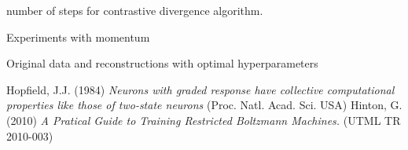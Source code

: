 \documentclass[a4paper]{scrartcl}
\begin{document}
\par number of steps for contrastive divergence algorithm.
\par Experiments with momentum
\par Original data and reconstructions with optimal hyperparameters
\begin{thebibliography}{9}
    Hopfield, J.J. (1984) \emph{Neurons with graded response have collective computational properties like those of two-state neurons} (Proc. Natl. Acad. Sci. USA)
    Hinton, G. (2010) \emph{A Pratical Guide to Training Restricted Boltzmann Machines.} (UTML TR 2010-003)
   
\end{thebibliography}
\end{document}
